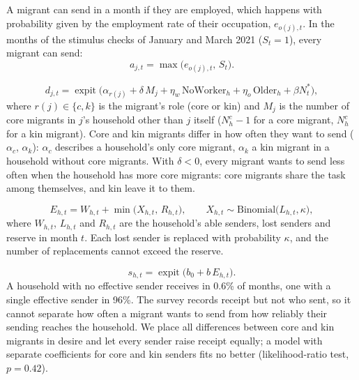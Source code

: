 
A migrant can send in a month if they are employed, which happens with probability given by the
employment rate of their occupation, $e_{o(j),t}$. In the months of the stimulus checks of January and
March 2021 ($S_t = 1$), every migrant can send:
\begin{equation}
a_{j,t} = \max\big(e_{o(j),t},\, S_t\big) .
\end{equation}

\begin{equation}
d_{j,t} = \operatorname{expit}\big(\alpha_{r(j)} + \delta\, M_j
  + \eta_w\, \mathrm{NoWorker}_h + \eta_o\, \mathrm{Older}_h + \beta N^*_t\big),
\end{equation}
where $r(j) \in \{c, k\}$ is the migrant's role (core or kin) and $M_j$ is the number of core migrants in
$j$'s household other than $j$ itself ($N^c_h - 1$ for a core migrant, $N^c_h$ for a kin migrant).
Core and kin migrants differ in how often they want to send ($\alpha_c$, $\alpha_k$): $\alpha_c$ describes
a household's only core migrant, $\alpha_k$ a kin migrant in a household without core migrants. With
$\delta < 0$, every migrant wants to send less often when the household has more core migrants: core
migrants share the task among themselves, and kin leave it to them.

\begin{equation}
E_{h,t} = W_{h,t} + \min\big(X_{h,t},\, R_{h,t}\big), \qquad X_{h,t} \sim \mathrm{Binomial}\big(L_{h,t}, \kappa\big),
\end{equation}
where $W_{h,t}$, $L_{h,t}$ and $R_{h,t}$ are the household's able senders, lost senders and reserve in
month $t$. Each lost sender is replaced with probability $\kappa$, and the number of replacements
cannot exceed the reserve.

\begin{equation}
s_{h,t} = \operatorname{expit}\big(b_0 + b\, E_{h,t}\big) .
\end{equation}
A household with no effective sender receives in 0.6\% of months, one with a single effective sender in
96\%. The survey records receipt but not who sent, so it cannot separate how often a migrant wants to
send from how reliably their sending reaches the household. We place all differences between core and
kin migrants in desire and let every sender raise receipt equally; a model with separate coefficients for
core and kin senders fits no better (likelihood-ratio test, $p = 0.42$).

